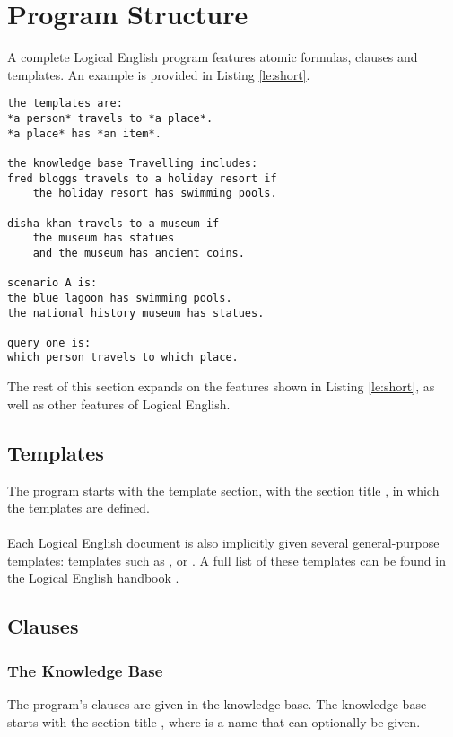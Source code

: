 \documentclass[../main.tex]{subfiles}
\begin{document}
\section{Program Structure}
A complete Logical English program features atomic formulas, clauses and templates. An example is provided in Listing \ref{le:short}.
\newpage
\begin{lstlisting}[language={LE},caption={A short Logical English program.},label={le:short}]
the templates are:
*a person* travels to *a place*.
*a place* has *an item*.

the knowledge base Travelling includes:
fred bloggs travels to a holiday resort if 
    the holiday resort has swimming pools.

disha khan travels to a museum if
    the museum has statues 
    and the museum has ancient coins.

scenario A is:
the blue lagoon has swimming pools.
the national history museum has statues.

query one is:
which person travels to which place.
\end{lstlisting}
The rest of this section expands on the features shown in Listing \ref{le:short}, as well as other features of Logical English.
\subsection{Templates}
The program starts with the template section, with the section title , in which the templates are defined. 
\\
\\
Each Logical English  document is also implicitly given several general-purpose templates: templates such as , or . A full list of these templates can be found in the Logical English handbook \cite{le_handbook}.

\subsection{Clauses}
\label{section:knowledge-base}
\subsubsection{The Knowledge Base}
The program's clauses are given in the knowledge base. The knowledge base starts with the section title , where  is a name that can optionally be given.
\end{document}
